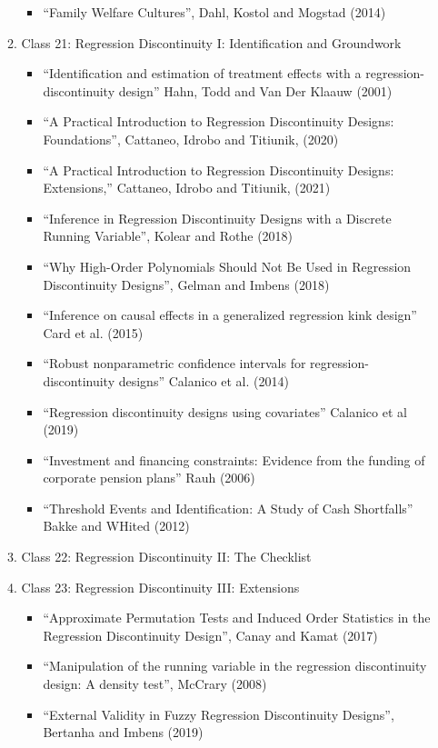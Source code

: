 \documentclass[11pt, a4paper]{article}
\begin{document}
\begin{enumerate}
\begin{enumerate}
\begin{itemize}
    \item ``Family Welfare Cultures'', Dahl, Kostol and Mogstad (2014)
    \end{itemize}
  \item Class 21: Regression Discontinuity I: Identification and Groundwork
    \begin{itemize}
    \item ``Identification and estimation of treatment effects with a regression-discontinuity design'' Hahn, Todd and Van Der Klaauw (2001)
    \item ``A Practical Introduction to Regression Discontinuity Designs: Foundations'', Cattaneo, Idrobo and Titiunik, (2020)
    \item ``A Practical Introduction to Regression Discontinuity Designs: Extensions,''  Cattaneo, Idrobo and Titiunik, (2021)
    \item ``Inference in Regression Discontinuity Designs with a Discrete Running Variable'', Kolear and Rothe (2018)
    \item ``Why High-Order Polynomials Should Not Be Used in Regression Discontinuity Designs'', Gelman and Imbens (2018)
    \item ``Inference on causal effects in a generalized regression kink design'' Card et al. (2015)
    \item ``Robust nonparametric confidence intervals for regression-discontinuity designs'' Calanico et al. (2014)
    \item ``Regression discontinuity designs using covariates'' Calanico et al (2019)
    \item  ``Investment and financing constraints: Evidence from the funding of corporate pension plans'' Rauh (2006)
    \item ``Threshold Events and Identification: A Study of Cash Shortfalls'' Bakke and WHited (2012)
    \end{itemize}
  \item Class 22: Regression Discontinuity II: The Checklist
  \item Class 23: Regression Discontinuity III: Extensions
    \begin{itemize}
    \item ``Approximate Permutation Tests and Induced Order Statistics in the Regression Discontinuity Design'', Canay and Kamat (2017)
    \item ``Manipulation of the running variable in the regression discontinuity design: A density test'', McCrary (2008)
    \item ``External Validity in Fuzzy Regression Discontinuity Designs'', Bertanha and Imbens (2019)

\end{itemize}
\end{enumerate}
\end{enumerate}
\end{document}
